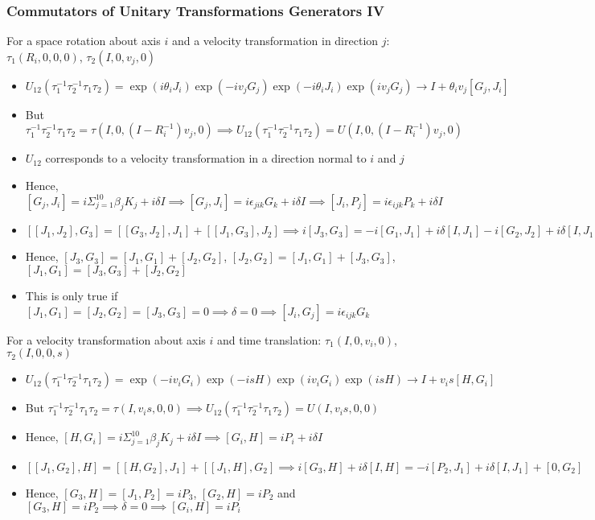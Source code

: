 \documentclass[8pt,t,mathserif,aspectratio=169]{beamer}
\begin{document}
\begin{frame}
  \frametitle{Commutators of Unitary Transformations Generators IV}
  \vspace{1mm}
    For a space rotation about axis $i$ and a velocity transformation in direction $j$: $\tau_1(R_i,0,0,0)$, $\tau_2(I,0,v_j,0)$
  \begin{itemize}
    \item $U_{12}(\tau^{-1}_1 \tau^{-1}_2 \tau_1 \tau_2) = \exp(i \theta_i J_i) \exp(-i v_j G_j) \exp(-i \theta_i J_i) \exp(i v_j G_j) \to I + \theta_i v_j [G_j,J_i]$
    \item But $\tau^{-1}_1 \tau^{-1}_2 \tau_1 \tau_2 = \tau(I,0,(I - R^{-1}_i)v_j,0) \implies U_{12}(\tau^{-1}_1 \tau^{-1}_2 \tau_1 \tau_2) = U(I,0,(I - R^{-1}_i)v_j,0)$
    \item $U_{12}$ corresponds to a velocity transformation in a direction normal to $i$ and $j$ 
    \item Hence, $[G_j,J_i] = i \Sigma_{j = 1}^{10} \beta_j K_j + i \delta I \implies [G_j,J_i] = i \epsilon_{jik} G_k + i \delta I  \implies [J_i,P_j] = i \epsilon_{ijk} P_k + i \delta I$
    \item $[[J_1,J_2],G_3] = [[G_3,J_2],J_1] + [[J_1,G_3],J_2] \implies i[J_3,G_3] = -i[G_1,J_1] + i \delta [I,J_1] - i[G_2,J_2] + i \delta [I,J_1]$
    \item Hence, $[J_3,G_3] = [J_1,G_1] + [J_2,G_2]$, $[J_2,G_2] = [J_1,G_1] + [J_3,G_3]$, $[J_1,G_1] = [J_3,G_3] + [J_2,G_2]$
    \item This is only true if $[J_1,G_1] = [J_2,G_2] = [J_3,G_3] = 0 \implies \delta = 0 \implies [J_i,G_j] = i \epsilon_{ijk} G_k$
  \end{itemize}
  For a velocity transformation about axis $i$ and time translation: $\tau_1(I,0,v_i,0)$, $\tau_2(I,0,0,s)$
  \begin{itemize}
    \item $U_{12}(\tau^{-1}_1 \tau^{-1}_2 \tau_1 \tau_2) = \exp(-i v_i G_i) \exp(-i s H) \exp(i v_i G_i) \exp(i s H) \to I + v_i s [H,G_i]$
    \item But $\tau^{-1}_1 \tau^{-1}_2 \tau_1 \tau_2 = \tau(I,v_i s,0,0) \implies U_{12}(\tau^{-1}_1 \tau^{-1}_2 \tau_1 \tau_2) = U(I,v_i s,0,0)$
    \item Hence, $[H,G_i] = i \Sigma_{j = 1}^{10} \beta_j K_j + i \delta I \implies [G_i,H] = i P_i + i \delta I$
    \item $[[J_1,G_2],H] = [[H,G_2],J_1] + [[J_1,H],G_2] \implies i[G_3,H] + i \delta [I,H] = -i[P_2,J_1] + i \delta [I,J_1] + [0,G_2]$
    \item Hence, $[G_3,H] = [J_1,P_2] = i P_3$, $[G_2,H] = i P_2$ and $[G_3,H] = i P_2 \implies \delta = 0 \implies [G_i,H] = i P_i$
  \end{itemize}
\end{frame}
\end{document}
